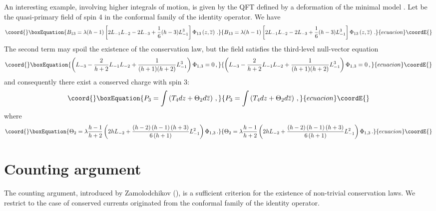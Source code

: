 \documentclass[a4paper,12pt]{report}
\begin{document}
An interesting example, involving higher integrals of motion, is given by the QFT defined by a \coordHE{}
deformation of the minimal model \coordHE{}. Let \coordHE{} be the quasi-primary field of spin
4 in the conformal family of the identity operator. We have
\begin{equation}\coord{}\boxEquation{
B_{13}=\lambda(h-1)\left[2L_{-1}L_{-2}-2L_{-3}+\frac{1}{6}(h-3)L_{-1}^{3}\right]\Phi_{13}\left(z,\overline{z}\right)\,.
}{
B_{13}=\lambda(h-1)\left[2L_{-1}L_{-2}-2L_{-3}+\frac{1}{6}(h-3)L_{-1}^{3}\right]\Phi_{13}\left(z,\overline{z}\right)\,.
}{ecuacion}\coordE{}\end{equation}
The second term may spoil the existence of the conservation law, but the field \coordHE{} satisfies the
third-level null-vector equation
\begin{equation}\coord{}\boxEquation{\label{3levnull}
\left(L_{-3}-\frac{2}{h+2}L_{-1}L_{-2}+\frac{1}{(h+1)(h+2)}L_{-1}^{3}\right)\Phi_{1,3}=0 \,,
}{\left(L_{-3}-\frac{2}{h+2}L_{-1}L_{-2}+\frac{1}{(h+1)(h+2)}L_{-1}^{3}\right)\Phi_{1,3}=0 \,,
}{ecuacion}\coordE{}\end{equation}
and consequently there exist a conserved charge with spin 3:
\begin{equation}\coord{}\boxEquation{
P_{3}=\int\left(T_{4} dz+\Theta_{2} d \overline{z}\right) \,,
}{
P_{3}=\int\left(T_{4} dz+\Theta_{2} d \overline{z}\right) \,,
}{ecuacion}\coordE{}\end{equation}
where
\begin{equation}\coord{}\boxEquation{
\Theta_{2}=\lambda\frac{h-1}{h+2}\left(2h
L_{-2}+\frac{\left(h-2\right)\left(h-1\right)\left(h+3\right)}{6\left(h+1\right)}L_{-1}^{2}\right)\Phi_{1,3} \, .
}{
\Theta_{2}=\lambda\frac{h-1}{h+2}\left(2h
L_{-2}+\frac{\left(h-2\right)\left(h-1\right)\left(h+3\right)}{6\left(h+1\right)}L_{-1}^{2}\right)\Phi_{1,3} \, .
}{ecuacion}\coordE{}\end{equation}

\vspace{1cm}

\section{Counting argument}

The counting argument, introduced by Zamolodchikov (\cite{sbrind}), is a sufficient criterion for the existence of
non-trivial conservation laws. We restrict to the case of conserved currents originated from the conformal family
of the identity operator.
\end{document}
